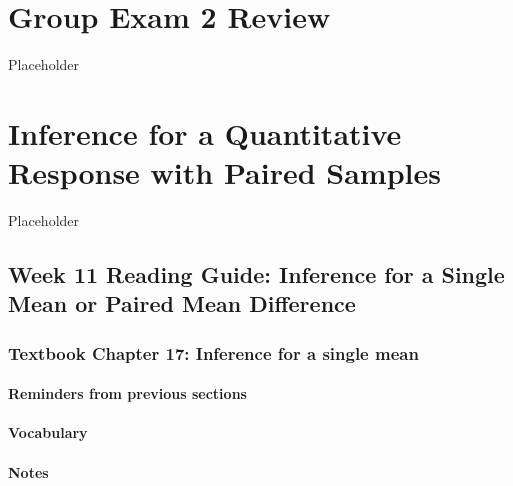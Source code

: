 \documentclass[
]{report}
\begin{document}
\hypertarget{group-exam-2-review}{%
\chapter{Group Exam 2 Review}\label{group-exam-2-review}}

Placeholder

\hypertarget{inference-for-a-quantitative-response-with-paired-samples}{%
\chapter{Inference for a Quantitative Response with Paired Samples}\label{inference-for-a-quantitative-response-with-paired-samples}}

Placeholder

\hypertarget{week-11-reading-guide-inference-for-a-single-mean-or-paired-mean-difference}{%
\section{Week 11 Reading Guide: Inference for a Single Mean or Paired Mean Difference}\label{week-11-reading-guide-inference-for-a-single-mean-or-paired-mean-difference}}

\hypertarget{textbook-chapter-17-inference-for-a-single-mean}{%
\subsection*{Textbook Chapter 17: Inference for a single mean}\label{textbook-chapter-17-inference-for-a-single-mean}}

\hypertarget{reminders-from-previous-sections-9}{%
\subsubsection*{Reminders from previous sections}\label{reminders-from-previous-sections-9}}

\hypertarget{vocabulary-17}{%
\subsubsection*{Vocabulary}\label{vocabulary-17}}

\hypertarget{notes-22}{%
\subsubsection*{Notes}\label{notes-22}}
\end{document}
